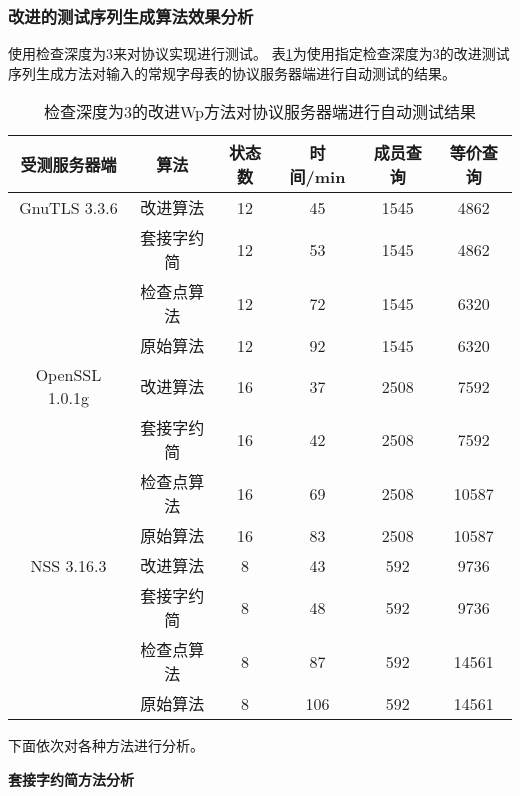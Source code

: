 \subsubsection{改进的测试序列生成算法效果分析}
使用检查深度为3来对协议实现进行测试。
表\ref{table:chap04-testresult}为使用指定检查深度为3的改进测试序列生成方法对输入的常规字母表的协议服务器端进行自动测试的结果。

\begin{table}[htb]
  \centering
  \caption{检查深度为3的改进Wp方法对协议服务器端进行自动测试结果}
\begin{tabular}{|c|c|c|c|c|c|}
  \hline
  受测服务器端	& 算法 		& 状态数  	&  时间/min 	 	&成员查询 	&等价查询    \\
  \hline
  GnuTLS 3.3.6	&改进算法	&  12		&	45		&	1545		&	4862		    \\
  				&套接字约简	&	12		&	53		&	1545		&	4862 	\\
   				&检查点算法  &	12		&	72		&	1545	&	6320		\\
   				&原始算法    &	12		&	92		&	1545	&	6320		\\
  \hline
  OpenSSL 1.0.1g 	& 改进算法 	& 16    &	37		&	2508		&  	7592		\\
    				&套接字约简	&16			&42			&	2508		&	7592		\\
    				&检查点算法	&	16		&	69		&	2508		&	10587	\\
    				&原始算法	&	16		&	83		&	2508		&	10587		\\
  \hline
  NSS 3.16.3 		&改进算法    & 	8		&	43		&	592		&	9736		\\
    				&套接字约简	&	8		&	48		&	592		&	9736		\\

  					&检查点算法  &	8		&	87		&	592		&	14561		\\
   					&原始算法	&	8		&	106	&	592		&	14561		\\

  \hline
\end{tabular}
\label{table:chap04-testresult}
\end{table}

下面依次对各种方法进行分析。

\textbf{套接字约简方法分析}

